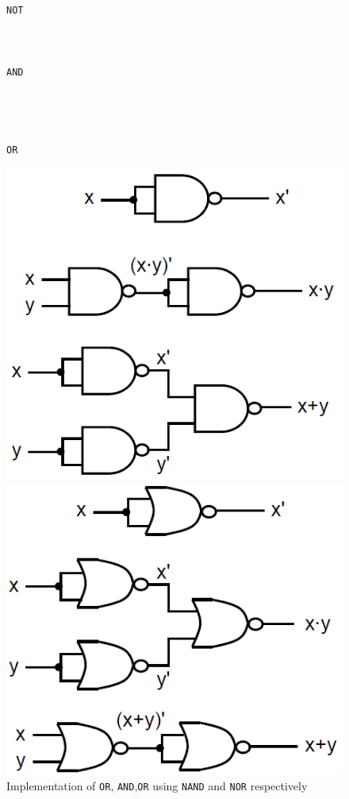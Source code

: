 \documentclass[12pt]{article}
\theoremstyle{definition}
\begin{document}
\begin{figure}[h]
\begin{minipage}{0.1\textwidth}\texttt{NOT}\\\\\\\\\texttt{AND}\\\\\\\\\\\texttt{OR}
\end{minipage}\hfill
\begin{minipage}{ 0.4\textwidth}\includegraphics[width=\textwidth]{4_9.png}
\end{minipage}\hfill
\begin{minipage}{0.4\textwidth}\includegraphics[width=\textwidth]{4_10.png}
\end{minipage}
\caption{Implementation of \texttt{OR}, \texttt{AND},\texttt{OR} using \texttt{NAND} and \texttt{NOR} respectively} 
\end{figure}
\end{document}
